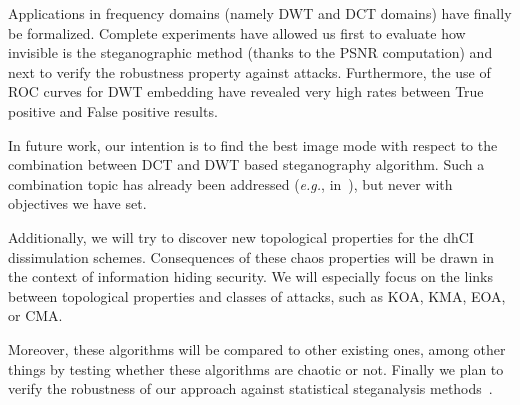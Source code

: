 \documentclass{comjnl}
\begin{document}
Applications in frequency domains (namely DWT and DCT domains) have finally be
formalized.
Complete experiments have allowed us 
first to evaluate how invisible is the steganographic method (thanks to the PSNR computation) and next to verify the robustness property against attacks.
Furthermore, the use of ROC curves for DWT embedding have revealed very high rates
between True positive and False positive results.

In future work, our intention is to find the best image mode with respect to  
the combination between  DCT and DWT based steganography
algorithm. Such a combination topic has already been addressed
(\textit{e.g.}, in~\cite{al2007combined}), but never with objectives
we have set.


Additionally, we will try to discover new topological properties for the dhCI
dissimulation schemes.
Consequences of these chaos properties will be drawn in the context of 
information hiding security.
We will especially focus on the links between topological properties and classes
of attacks, such as KOA, KMA, EOA, or CMA.

Moreover, these algorithms will be compared to other existing ones, among other
things by testing whether these algorithms are chaotic or not.
Finally we plan to verify the robustness of our approach 
against statistical steganalysis methods~\cite{GFH06,ChenS08,DongT08,FridrichKHG11a}.







\end{document}
